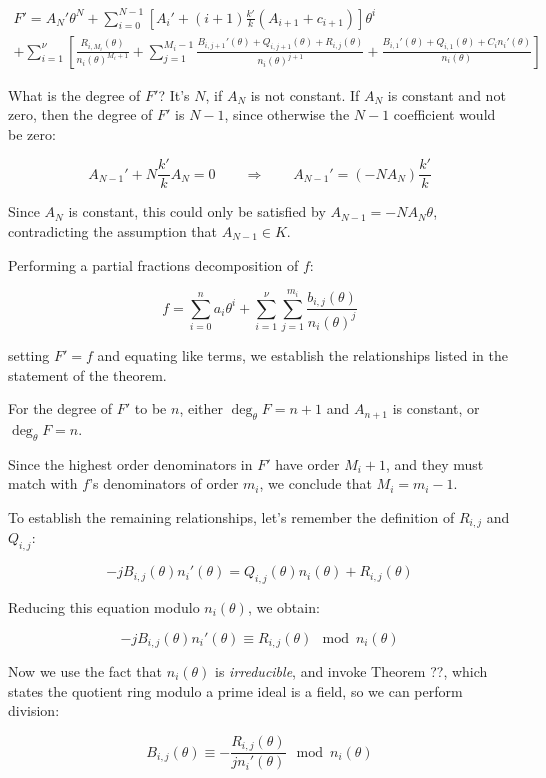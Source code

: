 \begin{multline*}
F' = A_N' \theta^N + \sum_{i=0}^{N-1} \left[ A_i' + (i+1) \frac{k'}{k} (A_{i+1} + c_{i+1})\right] \theta^{i} \\
+ \sum_{i=1}^\nu \left[ \frac{R_{i,M_i}(\theta)}{n_i(\theta)^{M_i+1}}
+ \sum_{j=1}^{M_i-1} \frac{B_{i,j+1}'(\theta) + Q_{i,j+1}(\theta) + R_{i,j}(\theta)}{n_i(\theta)^{j+1}}
  + \frac{B_{i,1}'(\theta) + Q_{i,1}(\theta) + C_i n_i'(\theta)}{n_i(\theta)} \right]
\end{multline*}

What is the degree of $F'$?  It's $N$, if $A_N$ is not constant.  If $A_N$ is constant and not zero, then
the degree of $F'$ is $N-1$, since otherwise the $N-1$ coefficient would be zero:

$$A_{N-1}' + N \frac{k'}{k} A_N = 0  \qquad\Longrightarrow\qquad A_{N-1}' = (- N A_N ) \frac{k'}{k}$$

Since $A_N$ is constant, this could only be satisfied by $A_{N-1} = - N A_N \theta$,
contradicting the assumption that $A_{N-1} \in K$.

Performing a partial fractions decomposition of $f$:

$$f = \sum_{i=0}^n a_i \theta^i
+ \sum_{i=1}^\nu \sum_{j=1}^{m_i} \frac{b_{i,j}(\theta)}{n_i(\theta)^j}$$

setting $F' = f$ and equating like terms, we establish the
relationships listed in the statement of the theorem.

For the degree of $F'$ to be $n$, either $\deg_\theta F = n+1$ and $A_{n+1}$ is
constant, or $\deg_\theta F = n$.

Since the highest order denominators in $F'$ have order $M_i + 1$, and
they must match with $f$'s denominators of order $m_i$, we conclude
that $M_i = m_i - 1$.

To establish the remaining relationships, let's remember the definition of
$R_{i,j}$ and $Q_{i,j}$:

$$-j B_{i,j}(\theta)n_i'(\theta) = Q_{i,j}(\theta) n_i(\theta) + R_{i,j}(\theta)$$

Reducing this equation modulo $n_i(\theta)$, we obtain:

$$-j B_{i,j}(\theta)n_i'(\theta) \equiv R_{i,j}(\theta) \mod n_i(\theta)$$

Now we use the fact that $n_i(\theta)$ is {\it irreducible},
and invoke Theorem ??, which states the quotient ring
modulo a prime ideal is a field, so we can perform division:

$$ B_{i,j}(\theta) \equiv - \frac{R_{i,j}(\theta)}{jn_i'(\theta)} \mod n_i(\theta)$$

